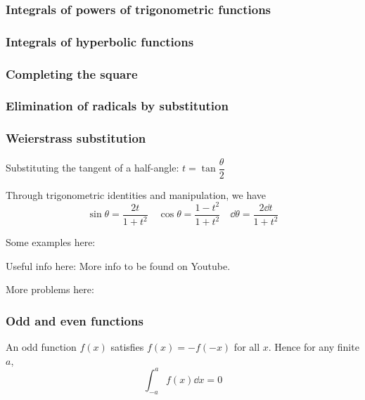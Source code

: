 \subsubsection{Integrals of powers of trigonometric functions}

\subsubsection{Integrals of hyperbolic functions}

\subsubsection{Completing the square}

\subsubsection{Elimination of radicals by substitution}

\subsubsection{Weierstrass substitution}
Substituting the tangent of a half-angle: $t=\tan\dfrac{\theta}{2}$

Through trigonometric identities and manipulation, we have
\[ \sin\theta = \frac{2t}{1+t^2} \quad \cos\theta = \frac{1-t^2}{1+t^2} \quad \dd{\theta} = \frac{2\dd{t}}{1+t^2} \]

Some examples here: %

Useful info here:
More info to be found on Youtube.

More problems here: %
\pagebreak

\subsubsection{Odd and even functions}
An odd function $f(x)$ satisfies $f(x)=-f(-x)$ for all $x$. Hence for any finite $a$,
\[ \int_{-a}^a f(x) \dd{x} = 0 \]

